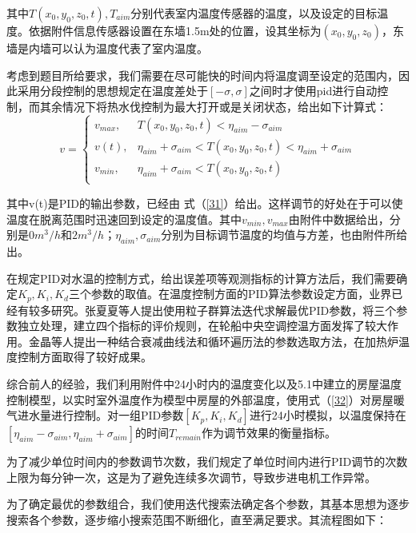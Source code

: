 \documentclass{my_paper}
\begin{document}
其中$T(x_0,y_0,z_0,t),T_{aim}$分别代表室内温度传感器的温度，以及设定的目标温度。依据附件信息传感器设置在东墙1.5m处的位置，设其坐标为$(x_0,y_0,z_0)$，东墙是内墙可以认为温度代表了室内温度。

考虑到题目所给要求，我们需要在尽可能快的时间内将温度调至设定的范围内，因此采用分段控制的思想规定在温度差处于$[-\sigma , \sigma] $之间时才使用pid进行自动控制，而其余情况下将热水伐控制为最大打开或是关闭状态，给出如下计算式：
\begin{equation}
v = \begin{cases}
    v_{max},&T(x_0,y_0,z_0,t)<\eta_{aim}-\sigma_{aim}\\
    v(t),&\eta_{aim}+\sigma_{aim}<T(x_0,y_0,z_0,t)<\eta_{aim}+\sigma_{aim}\\
    v_{min},&\eta_{aim}+\sigma_{aim}<T(x_0,y_0,z_0,t)\\
\end{cases}
\label{32}
\end{equation}

其中v(t)是PID的输出参数，已经由 式（\ref{31}）给出。这样调节的好处在于可以使温度在脱离范围时迅速回到设定的温度值。其中$ v_{min},v_{max} $由附件中数据给出，分别是$0 m^3/h$和$ 2 m^3/h $；$\eta_{aim},\sigma_{aim}$分别为目标调节温度的均值与方差，也由附件所给出。

在规定PID对水温的控制方式，给出误差项等观测指标的计算方法后，我们需要确定$K_p,K_i,K_d$三个参数的取值。在温度控制方面的PID算法参数设定方面，业界已经有较多研究。张夏夏\cite{6}等人提出使用粒子群算法迭代求解最优PID参数，将三个参数独立处理，建立四个指标的评价规则，在轮船中央空调控温方面发挥了较大作用。金晶等人\cite{5}提出一种结合衰减曲线法和循环遍历法的参数选取方法，在加热炉温度控制方面取得了较好成果。

综合前人的经验，我们利用附件中24小时内的温度变化以及5.1中建立的房屋温度控制模型，以实时室外温度作为模型中房屋的外部温度，使用式（\ref{32}）对房屋暖气进水量进行控制。对一组PID参数$[K_p,K_i,K_d]$进行24小时模拟，以温度保持在$ [\eta_{aim}-\sigma_{aim},\eta_{aim}+\sigma_{aim}] $的时间$T_{remain}$作为调节效果的衡量指标。

为了减少单位时间内的参数调节次数，我们规定了单位时间内进行PID调节的次数上限为每分钟一次，这是为了避免连续多次调节，导致步进电机工作异常。

为了确定最优的参数组合，我们使用迭代搜索法确定各个参数，其基本思想为逐步搜索各个参数，逐步缩小搜索范围不断细化，直至满足要求。其流程图如下：
\end{document}
